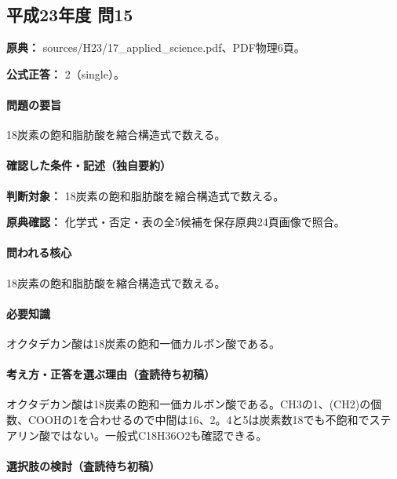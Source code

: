 \subsection{平成23年度 問15}
\label{q:h23-reg-applied-15}

\noindent\textbf{原典：} sources/H23/17\_applied\_science.pdf、PDF物理6頁。

\textbf{公式正答：} 2（single）。

\paragraph{問題の要旨} 18炭素の飽和脂肪酸を縮合構造式で数える。

\paragraph{確認した条件・記述（独自要約）}\mbox{}\par

\noindent\textbf{判断対象：} 18炭素の飽和脂肪酸を縮合構造式で数える。\par

\noindent\textbf{原典確認：} 化学式・否定・表の全5候補を保存原典24頁画像で照合。\par

\paragraph{問われる核心} 18炭素の飽和脂肪酸を縮合構造式で数える。

\paragraph{必要知識} オクタデカン酸は18炭素の飽和一価カルボン酸である。

\paragraph{考え方・正答を選ぶ理由（査読待ち初稿）} オクタデカン酸は18炭素の飽和一価カルボン酸である。CH3の1、(CH2)の個数、COOHの1を合わせるので中間は16、2。4と5は炭素数18でも不飽和でステアリン酸ではない。一般式C18H36O2も確認できる。

\paragraph{選択肢の検討（査読待ち初稿）}\mbox{}\par

